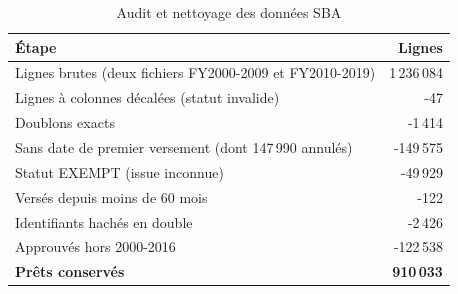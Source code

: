 \begin{table}[htbp]
\centering
\small\setlength{\tabcolsep}{4pt}
\caption{Audit et nettoyage des données SBA}\label{tab:nettoyage}
\begin{tabular}{lr}
\toprule
Étape & Lignes \\
\midrule
Lignes brutes (deux fichiers FY2000-2009 et FY2010-2019) & 1\,236\,084 \\
Lignes à colonnes décalées (statut invalide) & -47 \\
Doublons exacts & -1\,414 \\
Sans date de premier versement (dont 147\,990 annulés) & -149\,575 \\
Statut EXEMPT (issue inconnue) & -49\,929 \\
Versés depuis moins de 60 mois & -122 \\
Identifiants hachés en double & -2\,426 \\
Approuvés hors 2000-2016 & -122\,538 \\
\textbf{Prêts conservés} & \textbf{910\,033} \\
\bottomrule
\end{tabular}
\end{table}
